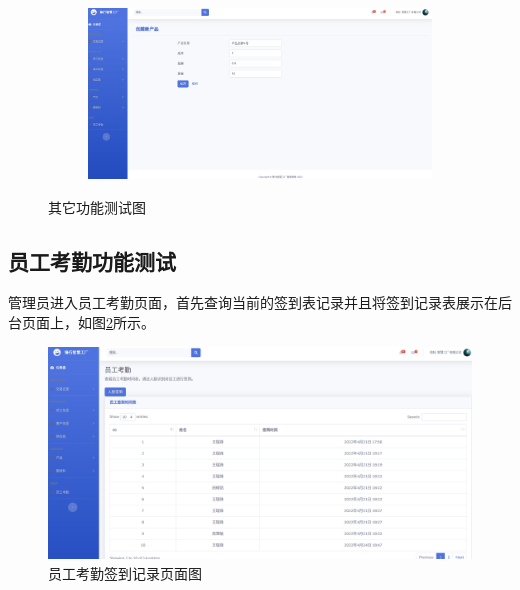 \begin{figure}[H]
\begin{subfigure}{.35\textwidth}
    \end{subfigure}
    \qquad
    \begin{subfigure}{.35\textwidth}
        \centering
        \includegraphics[width=\textwidth]{figures/6addnewproduct.png}
    \end{subfigure}
    \caption{其它功能测试图}
    \label{fig:otstst}
\end{figure}

\subsection{员工考勤功能测试}

管理员进入员工考勤页面，首先查询当前的签到表记录并且将签到记录表展示在后台页面上，如图\ref{fig:empleatdc}所示。

\begin{figure}[H]
    \centering
    \includegraphics[width=.75\textwidth]{figures/6employeeattendance.png}
    \caption{员工考勤签到记录页面图}
    \label{fig:empleatdc}
\end{figure}

